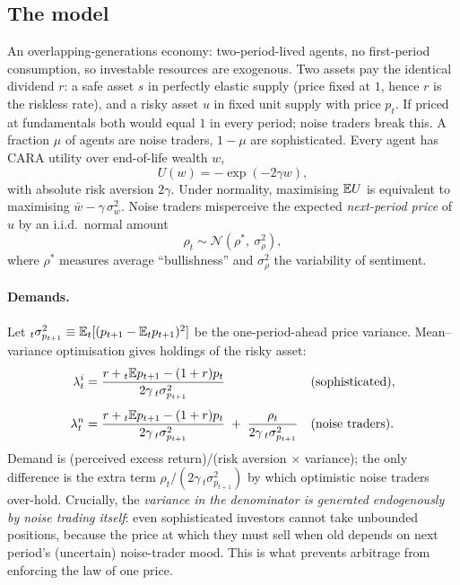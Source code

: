 \subsection*{The model}
An overlapping-generations economy: two-period-lived agents, no first-period consumption, so investable resources are exogenous. Two assets pay the identical dividend $r$: a safe asset $s$ in perfectly elastic supply (price fixed at $1$, hence $r$ is the riskless rate), and a risky asset $u$ in fixed unit supply with price $p_t$. If priced at fundamentals both would equal $1$ in every period; noise traders break this. A fraction $\mu$ of agents are noise traders, $1-\mu$ are sophisticated. Every agent has CARA utility over end-of-life wealth $w$,
\begin{equation}
U(w) = -\exp(-2\gamma w),
\end{equation}
with absolute risk aversion $2\gamma$. Under normality, maximising $\mathbb{E} U$ is equivalent to maximising $\bar w - \gamma\,\sigma_w^2$. Noise traders misperceive the expected \emph{next-period price} of $u$ by an i.i.d.\ normal amount
\begin{equation}
\rho_t \sim \mathcal N\!\left(\rho^\ast,\ \sigma_\rho^2\right),
\end{equation}
where $\rho^\ast$ measures average ``bullishness'' and $\sigma_\rho^2$ the variability of sentiment.

\paragraph{Demands.} Let ${}_t\sigma^2_{p_{t+1}}\equiv \mathbb{E}_t[(p_{t+1}-\mathbb{E}_t p_{t+1})^2]$ be the one-period-ahead price variance. Mean--variance optimisation gives holdings of the risky asset:
\begin{align}
\lambda^{i}_t &= \frac{r + {}_t\mathbb{E} p_{t+1} - (1+r)p_t}{2\gamma\, {}_t\sigma^2_{p_{t+1}}} && \text{(sophisticated)}, \label{eq:dssw-lami}\\[4pt]
\lambda^{n}_t &= \frac{r + {}_t\mathbb{E} p_{t+1} - (1+r)p_t}{2\gamma\, {}_t\sigma^2_{p_{t+1}}} \;+\; \frac{\rho_t}{2\gamma\, {}_t\sigma^2_{p_{t+1}}} && \text{(noise traders)}. \label{eq:dssw-lamn}
\end{align}
Demand is (perceived excess return)/(risk aversion $\times$ variance); the only difference is the extra term $\rho_t/(2\gamma\,{}_t\sigma^2_{p_{t+1}})$ by which optimistic noise traders over-hold. Crucially, the \emph{variance in the denominator is generated endogenously by noise trading itself}: even sophisticated investors cannot take unbounded positions, because the price at which they must sell when old depends on next period's (uncertain) noise-trader mood. This is what prevents arbitrage from enforcing the law of one price.

